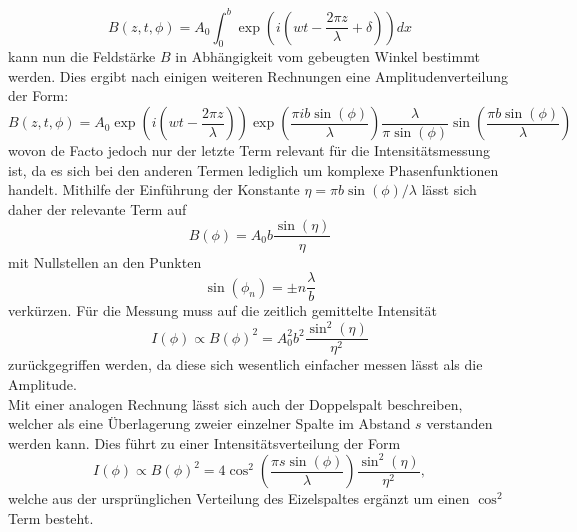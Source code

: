 \begin{equation}
B(z,t,\phi)=A_0 \int_{0}^{b} \exp(i(wt-\frac{2\pi z}{\lambda}+\delta))dx
\end{equation}
kann nun die Feldstärke $B$ in Abhängigkeit vom gebeugten Winkel bestimmt werden. Dies ergibt nach einigen weiteren Rechnungen eine 
Amplitudenverteilung der Form:
\begin{equation}
B(z,t,\phi)=A_0\exp(i(wt-\frac{2\pi z}{\lambda}))\exp(\frac{\pi ib\sin(\phi)}{\lambda})\frac{\lambda}{\pi \sin(\phi)}\sin(\frac{\pi b\sin(\phi)}{\lambda})
\end{equation}
wovon de Facto jedoch nur der letzte Term relevant für die Intensitätsmessung ist, da es sich bei den anderen
Termen lediglich um komplexe Phasenfunktionen handelt. Mithilfe der Einführung der Konstante $\eta=\pi b\sin(\phi)/\lambda$
lässt sich daher der relevante Term auf 
\begin{equation}
B(\phi)=A_0b\frac{\sin(\eta)}{\eta}
\end{equation}
mit Nullstellen an den Punkten
\begin{equation}
\sin(\phi_n)=\pm n\frac{\lambda}{b}
\end{equation}
verkürzen. Für die Messung muss auf die zeitlich gemittelte Intensität
\begin{equation}
    \label{eq:einfachspalt}
I(\phi)\propto B(\phi)^2=A_0^2b^2\frac{\sin^2(\eta)}{\eta^2}
\end{equation}
zurückgegriffen werden, da diese sich wesentlich einfacher messen lässt als die Amplitude. \\
Mit einer analogen Rechnung lässt sich auch der Doppelspalt beschreiben, welcher als eine Überlagerung zweier einzelner Spalte im Abstand $s$ verstanden
werden kann. Dies führt zu einer Intensitätsverteilung der Form
\begin{equation}
    \label{eq:doppelspalt}
I(\phi)\propto B(\phi)^2=4\cos^2(\frac{\pi s\sin(\phi)}{ \lambda })\frac{\sin^2(\eta)}{\eta^2},
\end{equation}
welche aus der ursprünglichen Verteilung des Eizelspaltes ergänzt um einen $\cos^2$ Term besteht.


